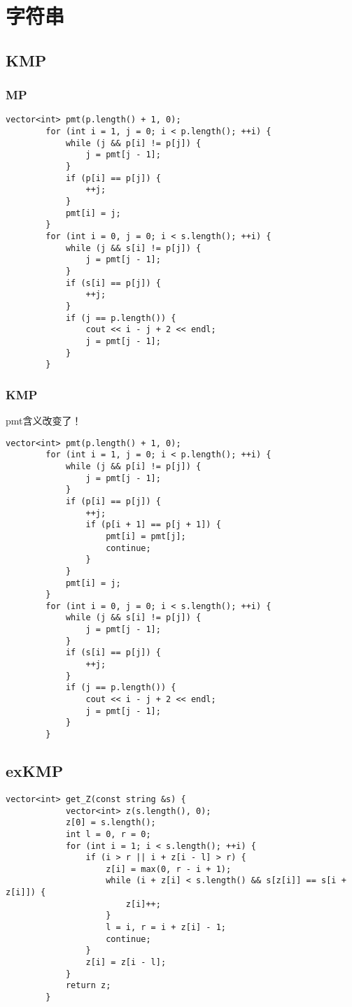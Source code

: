 \documentclass[12pt, a4paper]{ctexart}
\begin{document}
	\section{字符串}
	\subsection{KMP}
	\subsubsection{MP}
	\begin{lstlisting}[caption={}]
		vector<int> pmt(p.length() + 1, 0);
		for (int i = 1, j = 0; i < p.length(); ++i) {
			while (j && p[i] != p[j]) {
				j = pmt[j - 1];
			}
			if (p[i] == p[j]) {
				++j;
			}
			pmt[i] = j;
		}
		for (int i = 0, j = 0; i < s.length(); ++i) {
			while (j && s[i] != p[j]) {
				j = pmt[j - 1];
			}
			if (s[i] == p[j]) {
				++j;
			}
			if (j == p.length()) {
				cout << i - j + 2 << endl;
				j = pmt[j - 1];
			}
		}
	\end{lstlisting}
	\subsubsection{KMP}
	pmt含义改变了！
	\begin{lstlisting}[caption={}]
		vector<int> pmt(p.length() + 1, 0);
		for (int i = 1, j = 0; i < p.length(); ++i) {
			while (j && p[i] != p[j]) {
				j = pmt[j - 1];
			}
			if (p[i] == p[j]) {
				++j;
				if (p[i + 1] == p[j + 1]) {
					pmt[i] = pmt[j];
					continue;
				}
			}
			pmt[i] = j;
		}
		for (int i = 0, j = 0; i < s.length(); ++i) {
			while (j && s[i] != p[j]) {
				j = pmt[j - 1];
			}
			if (s[i] == p[j]) {
				++j;
			}
			if (j == p.length()) {
				cout << i - j + 2 << endl;
				j = pmt[j - 1];
			}
		}
	\end{lstlisting}
	\subsection{exKMP}
	\begin{lstlisting}[caption={}]
		vector<int> get_Z(const string &s) {
			vector<int> z(s.length(), 0);
			z[0] = s.length();
			int l = 0, r = 0;
			for (int i = 1; i < s.length(); ++i) {
				if (i > r || i + z[i - l] > r) {
					z[i] = max(0, r - i + 1);
					while (i + z[i] < s.length() && s[z[i]] == s[i + z[i]]) {
						z[i]++;
					}
					l = i, r = i + z[i] - 1;
					continue;
				}
				z[i] = z[i - l];
			}
			return z;
		}
	\end{lstlisting}
\end{document}
